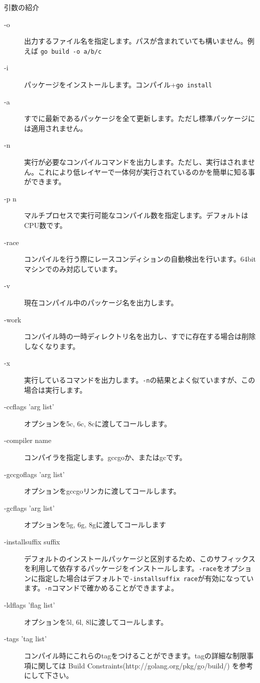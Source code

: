 引数の紹介

\begin{description}
  \item[-o] 出力するファイル名を指定します。パスが含まれていても構いません。例えば \texttt{go build -o a\//b\//c}
  \item[-i] パッケージをインストールします。コンパイル+\texttt{go install}
  \item[-a] すでに最新であるパッケージを全て更新します。ただし標準パッケージには適用されません。
  \item[-n] 実行が必要なコンパイルコマンドを出力します。ただし、実行はされません。これにより低レイヤーで一体何が実行されているのかを簡単に知る事ができます。
  \item[-p n] マルチプロセスで実行可能なコンパイル数を指定します。デフォルトはCPU数です。
  \item[-race] コンパイルを行う際にレースコンディションの自動検出を行います。64bitマシンでのみ対応しています。
  \item[-v] 現在コンパイル中のパッケージ名を出力します。
  \item[-work] コンパイル時の一時ディレクトリ名を出力し、すでに存在する場合は削除しなくなります。
  \item[-x] 実行しているコマンドを出力します。\texttt{-n}の結果とよく似ていますが、この場合は実行します。
  \item[-ccflags 'arg list'] オプションを5c, 6c, 8cに渡してコールします。
  \item[-compiler name] コンパイラを指定します。gccgoか、またはgcです。
  \item[-gccgoflags 'arg list'] オプションをgccgoリンカに渡してコールします。
  \item[-gcflags 'arg list'] オプションを5g, 6g, 8gに渡してコールします
  \item[-installsuffix suffix] デフォルトのインストールパッケージと区別するため、このサフィックスを利用して依存するパッケージをインストールします。\texttt{-race}をオプションに指定した場合はデフォルトで\texttt{-installsuffix race}が有効になっています。\texttt{-n}コマンドで確かめることができますよ。
  \item[-ldflags 'flag list'] オプションを5l, 6l, 8lに渡してコールします。
  \item[-tags 'tag list'] コンパイル時にこれらのtagをつけることができます。tagの詳細な制限事項に関しては Build Constraints(http:\//\//golang.org\//pkg\//go\//build\//) を参考にして下さい。
\end{description}
